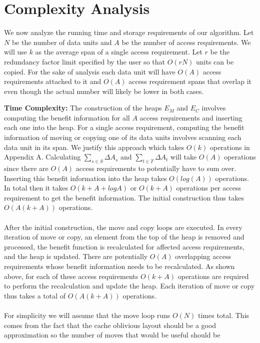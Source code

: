 \section{Complexity Analysis}

We now analyze the running time and storage requirements of our algorithm. Let
$N$ be the number of data units and $A$ be the number of access requirements.
We will use $k$ as the average span of a single access requirement. Let $r$ be the redundancy factor limit specified by the user so that $O(rN)$ units can be copied. For the sake of analysis each data unit will have $O(A)$ access requirements attached to it and $O(A)$ access requirement spans that overlap it even though the actual number will likely be lower in both cases. 

{\bf Time Complexity:} The construction of the heaps $E_M$ and $E_C$ involves
computing the benefit information for all $A$ access requirements and inserting
each one into the heap. For a single access requirement, computing the benefit information of moving or copying one of its data units involves scanning each data unit in its span. We justify
this approach which takes $O(k)$ operations in Appendix A. Calculating $\sum_{s\in S}\Delta{A_s}$ and $\sum_{t\in T}\Delta{A_t}$ will take $O(A)$ operations since there are $O(A)$ access requirements to potentially have to sum over. Inserting this
benefit information into the heap takes $O(log (A))$ operations. In total then it takes $O(k + A + logA)$ or $O(k + A)$ operations per access requirement to get the benefit information. The initial construction thus takes $O(A(k+A))$ operations. \\
\\
After the initial construction, the move and copy loops are executed. In every iteration of move or copy, an element from the top of the heap is removed and processed, the benefit function is recalculated for affected access requirements, and the heap is updated. There are potentially $O(A)$ overlapping access requirements whose benefit information needs to be recalculated. As shown above, for each of these access requirements $O(k+A)$ operations are required to perform the recalculation and update the heap. Each iteration of move or copy thus takes a total of $O(A(k+A))$ operations.\\
\\
For simplicity we will assume that the move loop runs $O(N)$ times total. This comes from the fact that the
cache oblivious layout \cite{cacheobliviouslayout} should be a good
approximation so the number of moves that would be useful should be
